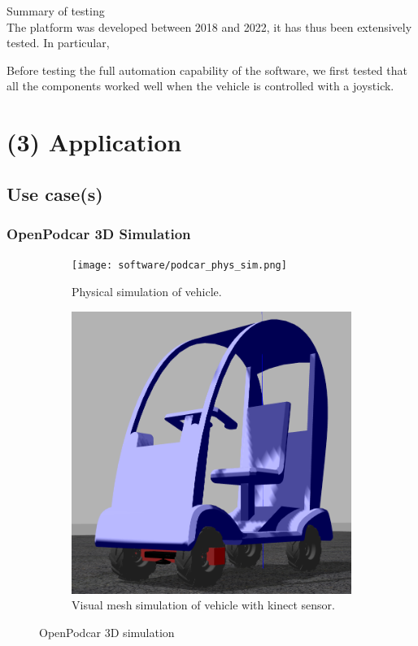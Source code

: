\documentclass[a4paper]{article}
\begin{document}
Summary of testing\\
The platform was developed between 2018 and 2022, it has thus been  extensively tested. In particular,  

Before testing the full automation capability of the software, we first tested that all the components worked well when the vehicle is controlled with a joystick.


\section{(3) Application}\label{h.f78bi3oom0mu}

\subsection{Use case(s)}\label{h.4q5g9edishy3}



\subsubsection{OpenPodcar 3D Simulation}

\begin{figure}
	\centering
	\begin{subfigure}{0.45\textwidth}
		\centering
		\texttt{[image: software/podcar\_phys\_sim.png]}
		\caption{Physical simulation of vehicle.}
		\label{fig:physSim}
	\end{subfigure}	
	\quad
	\begin{subfigure}{0.45\textwidth}
		\centering
		\includegraphics[width=0.75\columnwidth]{software/podcar_sim.png}
		\caption{Visual mesh simulation of vehicle with kinect sensor.}
		\label{fig:meshSim}
	\end{subfigure}
	\caption{OpenPodcar 3D simulation}
\end{figure}
\end{document}
